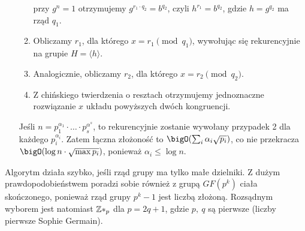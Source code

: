 \begin{greyframe}
\begin{enumerate}[I]
\begin{enumerate}
\[            \]
            przy \( g^n = 1 \) otrzymujemy \( g^{r_1 \cdot q_2} = b^{q_2} \), czyli \( h^{r_1} = b^{q_2} \), gdzie \( h = g^{q_2} \) ma rząd \( q_1 \).
            \item Obliczamy \( r_1 \), dla którego \( x = r_1 \pmod{q_1} \), wywołując się rekurencyjnie na grupie \( H = \langle h \rangle \).
            \item Analogicznie, obliczamy \( r_2 \), dla którego \( x = r_2 \pmod{q_2} \).
            \item Z chińskiego twierdzenia o resztach otrzymujemy jednoznaczne rozwiązanie \( x \) układu powyższych dwóch kongruencji.
        \end{enumerate}
        Jeśli \( n = p_1^{\alpha_1} \cdot \ldots \cdot p_s^{\alpha^s} \), to rekurencyjnie zostanie wywołany przypadek 2 dla każdego \( p_i^{\alpha_i} \). Zatem łączna złożoność to \( \bigO(\sum_i \alpha_i \sqrt{p_i}) \), co nie przekracza \( \bigO(\log n \cdot \sqrt{\max{p_i}}) \), ponieważ \( \alpha_i \leq \log n \).
    \end{enumerate}
\end{greyframe}
Algorytm działa szybko, jeśli rząd grupy ma tylko małe dzielniki. Z dużym prawdopodobieństwem poradzi sobie również z grupą \( GF(p^k) \) ciała skończonego, ponieważ rząd grupy \( p^k - 1 \) jest liczbą złożoną. Rozsądnym wyborem jest natomiast \( \mathbb{Z}*_p \) dla \( p = 2q + 1 \), gdzie \( p, \ q \) są pierwsze (liczby pierwsze Sophie Germain).